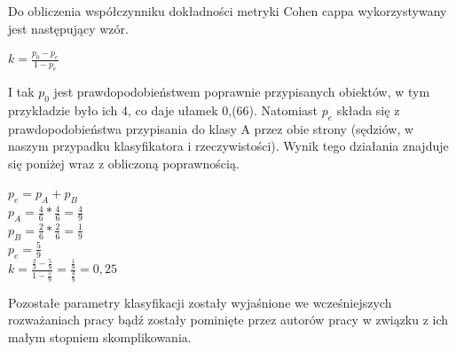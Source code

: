 \documentclass[12pt]{article}
\begin{document}
Do obliczenia współczynniku dokładności metryki Cohen cappa wykorzystywany jest następujący wzór.
\begin{center}
$ k = \frac{p_{0}-p_{e}}{1-p_{e}}$ \\
\end{center}

I tak $p_{0}$ jest prawdopodobieństwem poprawnie przypisanych obiektów, w tym przykładzie było ich 4, co daje ułamek 0,(66). Natomiast $p_{e}$ składa się z prawdopodobieństwa przypisania do klasy A przez obie strony (sędziów, w naszym przypadku klasyfikatora i rzeczywistości). Wynik tego działania znajduje się poniżej wraz z obliczoną poprawnością.
\begin{center}
$ p_{e} = p_{A} + p_{B} $ \\
$ p_{A} = \frac{4}{6} * \frac{4}{6} = \frac{4}{9}$ \\
$ p_{B} = \frac{2}{6} * \frac{2}{6} = \frac{1}{9}$ \\
$ p_{e} = \frac{5}{9} $ \\

$ k = \frac{\frac{2}{3}-\frac{5}{9}}{1 - \frac{5}{9}} = \frac{\frac{1}{9}}{\frac{4}{9}} = 0,25 $ \\
\end{center}

\indent Pozostałe parametry klasyfikacji zostały wyjaśnione we wcześniejszych rozważaniach pracy bądź zostały pominięte przez autorów pracy w związku z ich małym stopniem skomplikowania.
\newline
\end{document}
